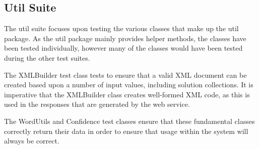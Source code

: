 \subsection{Util Suite}
\label{sub:test_util_suite}

The util suite focuses upon testing the various classes that make up the util 
package. As the util package mainly provides helper methods, the classes have 
been tested individually, however many of the classes would have been tested 
during the other test suites.

The XMLBuilder test class tests to ensure that a valid XML document can be 
created based upon a number of input values, including solution collections. It
is imperative that the XMLBuilder class creates well-formed XML code, as this is
used in the responses that are generated by the web service.

The WordUtils and Confidence test classes ensure that these fundamental classes
correctly return their data in order to ensure that usage within the system will
always be correct.

